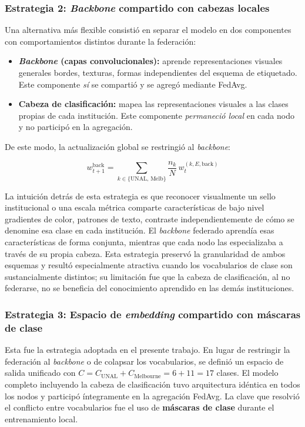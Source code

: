 \subsubsection{Estrategia 2: \textit{Backbone} compartido con cabezas locales}
 
Una alternativa más flexible consistió en separar el modelo en dos componentes con
comportamientos distintos durante la federación:

\begin{itemize}
    \item \textbf{\textit{Backbone} (capas convolucionales):} aprende representaciones
    visuales generales bordes, texturas, formas independientes del esquema de etiquetado.
    Este componente \emph{sí} se compartió y se agregó mediante FedAvg.

    \item \textbf{Cabeza de clasificación:} mapea las representaciones visuales a las clases
    propias de cada institución. Este componente \emph{permaneció local} en cada nodo y no
    participó en la agregación.
\end{itemize}

De este modo, la actualización global se restringió al \textit{backbone}:
 
\[
w_{t+1}^{\mathrm{back}} = \sum_{k \in \{\mathrm{UNAL},\,\mathrm{Melb}\}}
    \frac{n_k}{N}\, w_t^{(k,E,\mathrm{back})}
\]
 
La intuición detrás de esta estrategia es que reconocer visualmente un sello institucional
o una escala métrica comparte características de bajo nivel gradientes de color, patrones
de texto, contraste independientemente de cómo se denomine esa clase en cada institución.
El \textit{backbone} federado aprendía esas características de forma conjunta, mientras que
cada nodo las especializaba a través de su propia cabeza. Esta estrategia preservó la
granularidad de ambos esquemas y resultó especialmente atractiva cuando los vocabularios de
clase son sustancialmente distintos; su limitación fue que la cabeza de clasificación, al no
federarse, no se beneficia del conocimiento aprendido en las demás instituciones.
 
\subsubsection{Estrategia 3: Espacio de \textit{embedding} compartido con máscaras de clase}
\label{subsubsec:estrategia3}
 
Esta fue la estrategia adoptada en el presente trabajo. En lugar de restringir la
federación al \textit{backbone} o de colapsar los vocabularios, se definió un espacio de
salida unificado con $C = C_{\mathrm{UNAL}} + C_{\mathrm{Melbourne}} = 6 + 11 = 17$
clases. El modelo completo incluyendo la cabeza de clasificación tuvo arquitectura
idéntica en todos los nodos y participó íntegramente en la agregación FedAvg. La clave que
resolvió el conflicto entre vocabularios fue el uso de \textbf{máscaras de clase} durante
el entrenamiento local.

